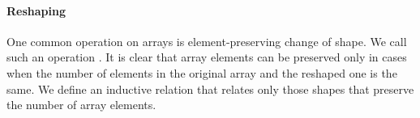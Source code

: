 \paragraph{Reshaping}
One common operation on arrays is element-preserving change of shape.  We call
such an operation .  It is clear that array elements can be preserved only in
cases when the number of elements in the original array and the reshaped one
is the same.  We define an inductive relation  that relates
only those shapes that preserve the number of array elements.  
\begin{code}[hide]%
%
\>[2]\AgdaSpace{}%
\AgdaSpace{}%
\<%
\\
%
\>[2]\<%
\end{code}
